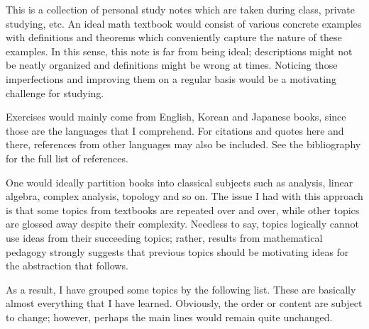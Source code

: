 
This is a collection of personal study notes
which are taken during class, private studying, etc.
An ideal math textbook would consist of various concrete examples
with definitions and theorems which conveniently capture
the nature of these examples.
In this sense, this note is far from being ideal;
descriptions might not be neatly organized
and definitions might be wrong at times.
Noticing those imperfections and improving them on a regular basis
would be a motivating challenge for studying.

Exercises would mainly come from English, Korean and Japanese books,
since those are the languages that I comprehend.
For citations and quotes here and there,
references from other languages may also be included.
See the bibliography for the full list of references.

One would ideally partition books into classical subjects such as
analysis, linear algebra, complex analysis, topology and so on.
The issue I had with this approach is that
some topics from textbooks are repeated over and over,
while other topics are glossed away despite their complexity.
Needless to say,
topics logically cannot use ideas from their succeeding topics;
rather, results from mathematical pedagogy strongly suggests that
previous topics should be motivating ideas
for the abstraction that follows.

As a result, I have grouped some topics by the following list.
These are basically almost everything that I have learned.
Obviously, the order or content are subject to change;
however, perhaps the main lines would remain quite unchanged.

